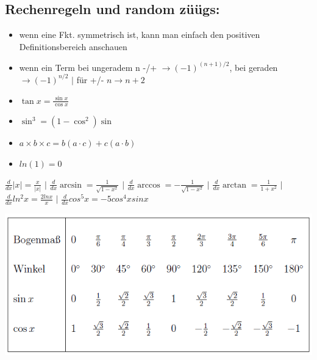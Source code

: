 \documentclass[a3paper, ngerman, 8pt]{article}
\begin{document}
\begin{multicols*}{3}
\subsection*{Rechenregeln und random züügs:} 
\begin{itemize}
	\item wenn eine Fkt. symmetrisch ist, kann man einfach den positiven Definitionsbereich anschauen
	\item wenn ein Term bei ungeradem n -/+ $\to (-1)^{(n+1)/2}$, bei geraden $\to (-1)^{n/2}$ $ \big \vert$ für +/- $n \to n+2$
	\item $\tan x = \frac{\sin x}{\cos x}$
	\item $\sin^3=(1-\cos^2)\sin$
	\item $a \times b \times c = b(a \cdot c) + c(a \cdot b)$
	\item $ln(1)=0$
\end{itemize}

$\frac{d}{dx} |x| = \frac{x}{|x|}$ $\big \vert$ $\frac{d}{dx} \arcsin = \frac{1}{\sqrt{1-x^2}}$ $\big \vert$ $\frac{d}{dx} \arccos = -\frac{1}{\sqrt{1-x^2}}$ $\big \vert$ $\frac{d}{dx} \arctan = \frac{1}{1+x^2}$ $\big \vert$ $\frac{d}{dx} ln^2x = \frac{2lnx}{x}$ $\big \vert$ $\frac{d}{dx}cos^5x=-5cos^4xsinx$

\includegraphics[width=1\linewidth]{winkel.png}





\end{multicols*}
\end{document}
